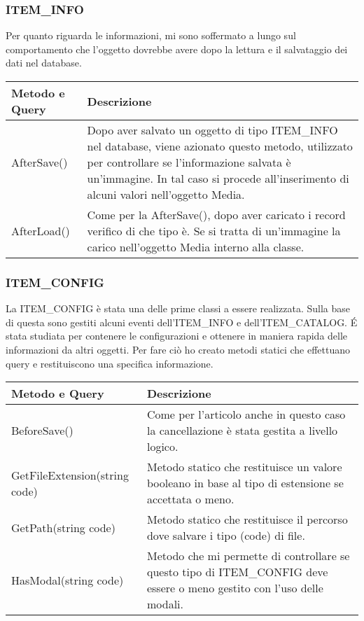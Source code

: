\subsubsection{ITEM\_INFO}
Per quanto riguarda le informazioni, mi sono soffermato a lungo sul comportamento che l'oggetto dovrebbe avere dopo la lettura e il salvataggio dei dati nel database. 
\begin{center}
	\begin{tabular}{ p{3cm}|p{} }
		\hline
		\textbf{Metodo e Query} & \textbf{Descrizione}\\
		\hline
		AfterSave() & Dopo aver salvato un oggetto di tipo ITEM\_INFO nel database, viene azionato questo metodo, utilizzato per controllare se l'informazione salvata è un'immagine. In tal  caso si procede all'inserimento di alcuni valori nell'oggetto Media.\\
		\hline
		AfterLoad() & Come per la AfterSave(), dopo aver caricato i record verifico di che tipo è. Se si tratta di un'immagine la carico nell'oggetto Media interno alla classe.\\
		
	\end{tabular}
\end{center}

\subsubsection{ITEM\_CONFIG}
La ITEM\_CONFIG è stata una delle prime classi a essere realizzata. Sulla base di questa sono gestiti alcuni eventi dell'ITEM\_INFO e dell'ITEM\_CATALOG. \'E stata studiata per contenere le configurazioni e ottenere in maniera rapida delle informazioni da altri oggetti. Per fare ciò ho creato metodi statici che effettuano query e restituiscono una specifica informazione.
\begin{center}
	\begin{tabular}{ p{4cm}|p{} }
		\hline
		\textbf{Metodo e Query} & \textbf{Descrizione}\\
		\hline
		BeforeSave()		& Come per l'articolo anche in questo caso la cancellazione è stata gestita a livello logico.\\
		\hline
		GetFileExtension(string code)	& Metodo statico che restituisce un valore booleano in base al tipo di estensione se accettata o meno.\\
		\hline
		GetPath(string code) & Metodo statico che restituisce il percorso dove salvare i tipo (code) di file.\\
		\hline
		HasModal(string code) & Metodo che mi permette di controllare se questo tipo di ITEM\_CONFIG deve essere o meno gestito con l'uso delle modali.\\

	\end{tabular}
\end{center}

